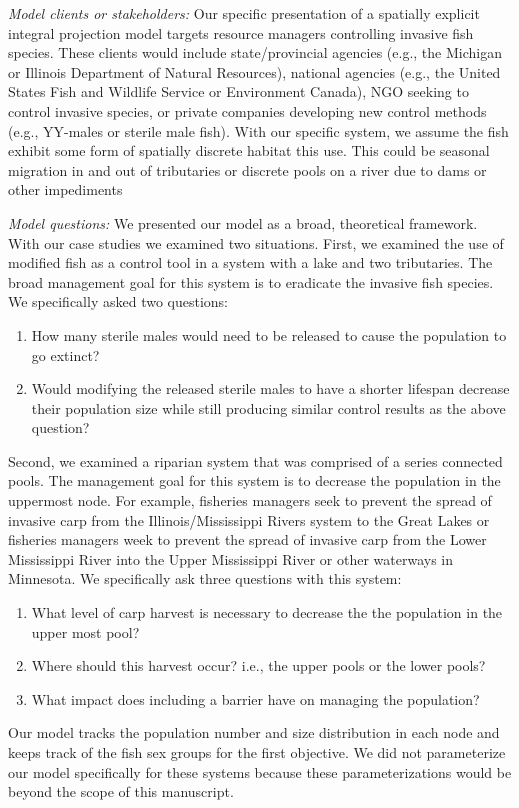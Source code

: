 \documentclass{article}[12pt]
\begin{document}
\textit{Model clients or stakeholders:}
Our specific presentation of a spatially explicit integral projection model targets resource managers controlling invasive fish species.
These clients would include state/provincial agencies (e.g., the Michigan or Illinois Department of Natural Resources), national agencies (e.g., the United States Fish and Wildlife Service or Environment Canada), NGO seeking to control invasive species, or private companies developing new control methods (e.g., YY-males or sterile male fish). 
With our specific system, we assume the fish exhibit some form of spatially discrete habitat this use.
This could be seasonal migration in and out of tributaries or discrete pools on a river due to dams or other impediments 

\textit{Model questions:}
We presented our model as a broad, theoretical framework. 
With our case studies we examined two situations.
First, we examined the use of modified fish as a control tool in a system with a lake and two tributaries.
The broad management goal for this system is to eradicate the invasive fish species. 
We specifically asked two questions:
\begin{enumerate}
\item How many sterile males would need to be released to cause the population to go extinct?
\item Would modifying the released sterile males to have a shorter lifespan decrease their population size while still producing similar control results as the above question? 
\end{enumerate}
Second, we examined a riparian system that was comprised of a series connected pools.
The management goal for this system is to decrease the population in the uppermost node.
For example, fisheries managers seek to prevent the spread of invasive carp from the Illinois/Mississippi Rivers system to the Great Lakes or fisheries managers week to prevent the spread of invasive carp from the Lower Mississippi River into the Upper Mississippi River or other waterways in Minnesota.
We specifically ask three questions with this system:
\begin{enumerate}
\item What level of carp harvest is necessary to decrease the the population in the upper most pool?
\item Where should this harvest occur? i.e., the upper pools or the lower pools? 
\item What impact does including a barrier have on managing the population? 
\end{enumerate}
Our model tracks the population number and size distribution in each node and keeps track of the fish sex groups for the first objective.  
We did not parameterize our model specifically for these systems because these parameterizations would be beyond the scope of this manuscript. 
\end{document}
